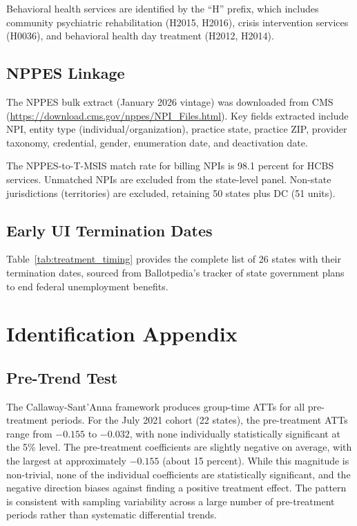 \documentclass[12pt]{article}
\begin{document}
Behavioral health services are identified by the ``H'' prefix, which includes community psychiatric rehabilitation (H2015, H2016), crisis intervention services (H0036), and behavioral health day treatment (H2012, H2014).

\subsection{NPPES Linkage}

The NPPES bulk extract (January 2026 vintage) was downloaded from CMS (\url{https://download.cms.gov/nppes/NPI_Files.html}). Key fields extracted include NPI, entity type (individual/organization), practice state, practice ZIP, provider taxonomy, credential, gender, enumeration date, and deactivation date.

The NPPES-to-T-MSIS match rate for billing NPIs is 98.1 percent for HCBS services. Unmatched NPIs are excluded from the state-level panel. Non-state jurisdictions (territories) are excluded, retaining 50 states plus DC (51 units).

\subsection{Early UI Termination Dates}

Table~\ref{tab:treatment_timing} provides the complete list of 26 states with their termination dates, sourced from Ballotpedia's tracker of state government plans to end federal unemployment benefits.



\section{Identification Appendix}

\subsection{Pre-Trend Test}

The Callaway-Sant'Anna framework produces group-time ATTs for all pre-treatment periods. For the July 2021 cohort (22 states), the pre-treatment ATTs range from $-0.155$ to $-0.032$, with none individually statistically significant at the 5\% level. The pre-treatment coefficients are slightly negative on average, with the largest at approximately $-0.155$ (about 15 percent). While this magnitude is non-trivial, none of the individual coefficients are statistically significant, and the negative direction biases against finding a positive treatment effect. The pattern is consistent with sampling variability across a large number of pre-treatment periods rather than systematic differential trends.
\end{document}
